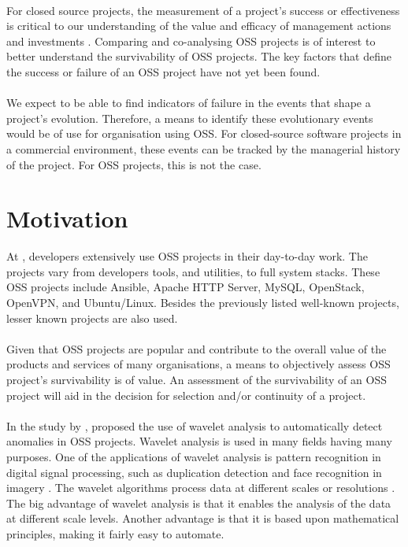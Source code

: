 \paragraph{}
For closed source projects, the measurement of a project's success or
effectiveness is critical to our understanding of the value and efficacy of
management actions and investments \cite{delone2003}. Comparing and
co-analysing OSS projects is of interest to better understand the survivability
of OSS projects. The key factors that define the success or failure of an OSS
project have not yet been found.

\paragraph{}
We expect to be able to find indicators of failure in the events that
shape a project's evolution. Therefore, a means to identify these evolutionary
events would be of use for organisation using OSS. For closed-source software
projects in a commercial environment, these events can be tracked by the
managerial history of the project. For OSS projects, this is not the case.



\section{Motivation}
At \hostOrg, developers extensively use OSS projects in their day-to-day
work. The projects vary from developers tools, and utilities, to full system
stacks. These OSS projects include Ansible, Apache HTTP Server, MySQL,
OpenStack, OpenVPN, and Ubuntu/Linux. Besides the previously listed well-known
projects, lesser known projects are also used.

\paragraph{}
Given that OSS projects are popular and contribute to the overall value of the
products and services of many organisations, a means to objectively assess OSS
project's survivability is of value. An assessment of the survivability of an
OSS project will aid in the decision for selection and/or continuity of a
project.

\paragraph{}
In the study \textit{\repltitle} by \citet{karus2013}, \citeauthor{karus2013}
proposed the use of wavelet analysis to automatically detect anomalies in OSS
projects.
Wavelet analysis is used in many fields having many purposes. One of the
applications of wavelet analysis is pattern recognition in digital signal
processing, such as duplication detection and face recognition in imagery
\cite{myna, wadkar}. The wavelet algorithms process data at different scales or
resolutions \cite{graps}. The big advantage of wavelet analysis is that
it enables the analysis of the data at different scale levels. Another
advantage is that it is based upon mathematical principles, making it fairly
easy to automate.

